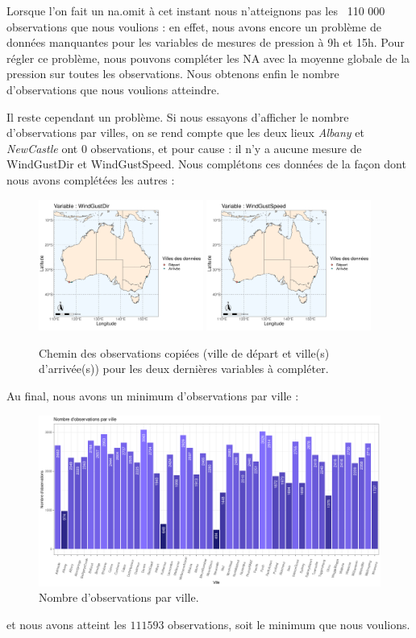 \documentclass{article}
\begin{document}
Lorsque l'on fait un na.omit à cet instant nous n'atteignons pas les ~110 000 observations que nous voulions : en effet, nous avons encore un problème de données manquantes pour les variables de mesures de pression à 9h et 15h. Pour régler ce problème, nous pouvons compléter les NA avec la moyenne globale de la pression sur toutes les observations. Nous obtenons enfin le nombre d'observations que nous voulions atteindre. 

Il reste cependant un problème. Si nous essayons d'afficher le nombre d'observations par villes, on se rend compte que les deux lieux \emph{Albany} et \emph{NewCastle} ont 0 observations, et pour cause : il n'y a aucune mesure de WindGustDir et WindGustSpeed. Nous complétons ces données de la façon dont nous avons complétées les autres : 

\begin{figure}[H]
    \centering
    \includegraphics[width=0.48\textwidth,page=1]{Ressources/Australia_map_segments_complete-5.jpg}
    \includegraphics[width=0.48\textwidth,page=2]{Ressources/Australia_map_segments_complete-6.jpg}
    \caption{Chemin des observations copiées (ville de départ et ville(s) d'arrivée(s)) pour les deux dernières variables à compléter.}
\end{figure}

Au final, nous avons un minimum d'observations par ville : 

\begin{figure}[H]
    \centering
    \includegraphics[width=\textwidth]{Ressources/completed_hist_observations_cities.png}
    \caption{Nombre d'observations par ville.}
\end{figure}

et nous avons atteint les $111593$ observations, soit le minimum que nous voulions.

\newpage
\printbibliography
\end{document}
